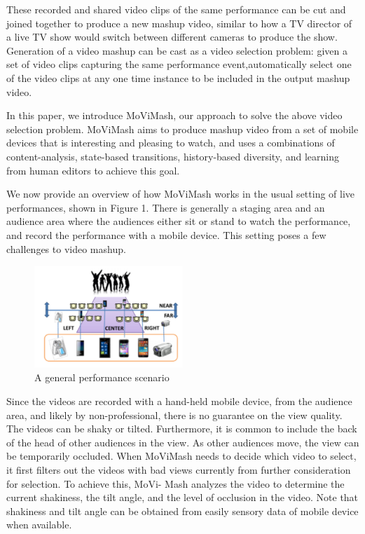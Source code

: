 \documentclass{new}
\begin{document}
These recorded and shared video clips of the same performance can be cut and joined together to produce a new mashup video, similar to how a TV director of a live TV show would switch between different cameras to produce the show. Generation of a video mashup can be cast as a video selection problem: given a set of video clips capturing the same performance event,automatically select one of the video clips at any one time instance to be included in the output mashup video.

In this paper, we introduce MoViMash, our approach to solve
the above video selection problem. MoViMash aims to produce
mashup video from a set of mobile devices that is interesting and
pleasing to watch, and uses a combinations of content-analysis,
state-based transitions, history-based diversity, and learning from
human editors to achieve this goal.

We now provide an overview of how MoViMash works in the
usual setting of live performances, shown in Figure 1. There is
generally a staging area and an audience area where the audiences either sit or stand to watch the performance, and record the performance with a mobile device. This setting poses a few challenges to video mashup.

\begin{figure}
    \centering
    \includegraphics[width=0.5\textwidth]{img1.png}
    \caption{A general performance scenario}
    \label{fig:1}
\end{figure}

Since the videos are recorded with a hand-held mobile device,
from the audience area, and likely by non-professional, there is no
guarantee on the view quality. The videos can be shaky or tilted.
Furthermore, it is common to include the back of the head of other
audiences in the view. As other audiences move, the view can be
temporarily occluded. When MoViMash needs to decide which
video to select, it first filters out the videos with bad views currently
from further consideration for selection. To achieve this, MoVi-
Mash analyzes the video to determine the current shakiness, the tilt
angle, and the level of occlusion in the video. Note that shakiness
and tilt angle can be obtained from easily sensory data of mobile
device when available.
\end{document}
